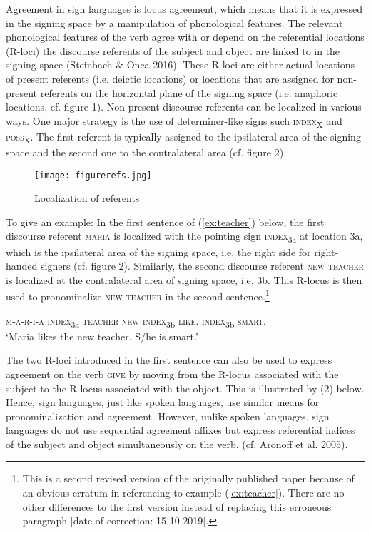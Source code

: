 \documentclass[11pt,a4paper,fleqn]{article}
\begin{document}
Agreement in sign languages is locus agreement, which means that it is expressed in the signing space by a manipulation of phonological features. The relevant phonological features of the verb agree with or depend on the referential locations (R-loci) the discourse referents of the subject and object are linked to in the signing space (Steinbach \& Onea 2016). These R-loci are either actual locations of present referents (i.e. deictic locations) or locations that are assigned for non-present referents on the horizontal plane of the signing space (i.e. anaphoric locations, cf. figure 1). Non-present discourse referents can be localized in various ways. One major strategy is the use of determiner-like signs such \textsc{index}\textsubscript{X} and \textsc{poss}\textsubscript{X}. The first referent is typically assigned to the ipsilateral area of the signing space and the second one to the contralateral area (cf. figure 2).

\begin{figure}[h]
    \centering
	\texttt{[image: figurerefs.jpg]}
    \caption{Localization of referents} \label{fig:schwan2}
\end{figure}

To give an example: In the first sentence of (\ref{ex:teacher}) below, the first discourse referent \textsc{maria} is localized with the pointing sign \textsc{index}\textsubscript{3a} at location 3a, which is the ipsilateral area of the signing space, i.e. the right side for right-handed signers (cf. figure 2). Similarly, the second discourse referent \textsc{new teacher} is localized at the contralateral area of signing space, i.e. 3b. This R-locus is then used to pronominalize \textsc{new teacher} in the second sentence.\footnote{This is a second revised version of the originally published paper because of an obvious erratum in referencing to example (\ref{ex:teacher}). There are no other differences to the first version instead of replacing this erroneous paragraph [date of correction: 15-10-2019].}

\begin{exe}
	\label{ex:teacher}
	\ex \textsc{m-a-r-i-a index}\textsubscript{3a} \textsc{teacher new index}\textsubscript{3b} \textsc{like. index}\textsubscript{3b} \textsc{smart.}\\
	‘Maria likes the new teacher. S/he is smart.’
\end{exe}

The two R-loci introduced in the first sentence can also be used to express agreement on the verb \textsc{give} by moving from the R-locus associated with the subject to the R-locus associated with the object. This is illustrated by (2) below. Hence, sign languages, just like spoken languages, use similar means for pronominalization and agreement. However, unlike spoken languages, sign languages do not use sequential agreement affixes but express referential indices of the subject and object simultaneously on the verb. (cf. Aronoff et al. 2005). 
\end{document}
